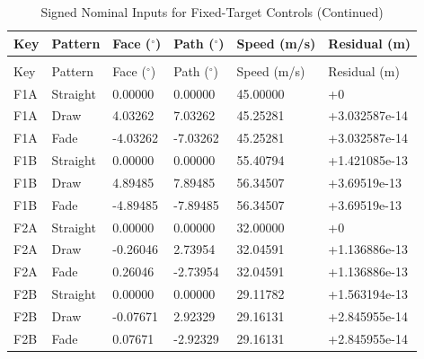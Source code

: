 \documentclass[11pt,letterpaper]{article}
\newcommand{\numtext}[1]{\textnormal{#1}}
\begin{document}
{\small

\begin{longtable}{llllll}
\caption{Signed Nominal Inputs for Fixed-Target Controls}\\
\toprule Key & Pattern & Face ($^\circ$) & Path ($^\circ$) & Speed (m/s) & Residual (m) \\ \midrule
\endfirsthead
\caption[]{Signed Nominal Inputs for Fixed-Target Controls (Continued)}\\
\toprule Key & Pattern & Face ($^\circ$) & Path ($^\circ$) & Speed (m/s) & Residual (m) \\ \midrule
\endhead
F1A & Straight & \numtext{0.00000} & \numtext{0.00000} & \numtext{45.00000} & \numtext{+0} \\
F1A & Draw & \numtext{4.03262} & \numtext{7.03262} & \numtext{45.25281} & \numtext{+3.032587e-14} \\
F1A & Fade & \numtext{-4.03262} & \numtext{-7.03262} & \numtext{45.25281} & \numtext{+3.032587e-14} \\
F1B & Straight & \numtext{0.00000} & \numtext{0.00000} & \numtext{55.40794} & \numtext{+1.421085e-13} \\
F1B & Draw & \numtext{4.89485} & \numtext{7.89485} & \numtext{56.34507} & \numtext{+3.69519e-13} \\
F1B & Fade & \numtext{-4.89485} & \numtext{-7.89485} & \numtext{56.34507} & \numtext{+3.69519e-13} \\
F2A & Straight & \numtext{0.00000} & \numtext{0.00000} & \numtext{32.00000} & \numtext{+0} \\
F2A & Draw & \numtext{-0.26046} & \numtext{2.73954} & \numtext{32.04591} & \numtext{+1.136886e-13} \\
F2A & Fade & \numtext{0.26046} & \numtext{-2.73954} & \numtext{32.04591} & \numtext{+1.136886e-13} \\
F2B & Straight & \numtext{0.00000} & \numtext{0.00000} & \numtext{29.11782} & \numtext{+1.563194e-13} \\
F2B & Draw & \numtext{-0.07671} & \numtext{2.92329} & \numtext{29.16131} & \numtext{+2.845955e-14} \\
F2B & Fade & \numtext{0.07671} & \numtext{-2.92329} & \numtext{29.16131} & \numtext{+2.845955e-14} \\
\bottomrule\end{longtable}

}
\end{document}
